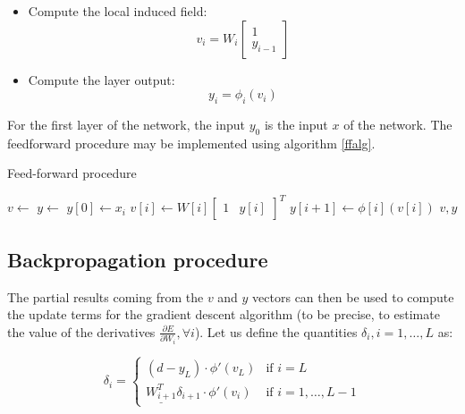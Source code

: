\documentclass[letterpaper,headings=standardclasses]{scrartcl}
\begin{document}
\begin{itemize}
    \item Compute the local induced field:
    $$ v_i = W_i \left[ \begin{matrix} 1 \\ y_{i - 1} \end{matrix} \right] $$
    \item Compute the layer output:
    $$ y_i = \phi_i (v_i) $$
\end{itemize}

For the first layer of the network, the input $y_0$ is the input $x$ of the network. The feedforward procedure may be implemented using algorithm \ref{ffalg}.

\begin{algorithm}[h]
    \caption{Feed-forward procedure}
    \label{ffalg}
    \begin{algorithmic}
    
        \State {}
        \State $v \gets $ 
        \State $y \gets $ 
        \State $y[0] \gets x_i$
        \State {}
            \State $v[i] \gets W[i] \left[ \begin{matrix} 1 & y[i] \end{matrix} \right]^T$
            \State $y[i + 1] \gets \phi[i](v[i])$
        \EndFor
        \State \Return $v, y$
    \EndFunction
    
    \end{algorithmic}
\end{algorithm}

\subsection{Backpropagation procedure}

The partial results coming from the $v$ and $y$ vectors can then be used to compute the update terms for the gradient descent algorithm (to be precise, to estimate the value of the derivatives $\frac{\partial E}{\partial W_i}, \forall i$). Let us define the quantities $\delta_i, i = 1, \dots, L$ as:

$$ \delta_i = \begin{cases} (d - y_L) \cdot \phi'(v_L) & \text{if } i = L \\ \underline{W_{i + 1}^T} \delta_{i + 1} \cdot \phi'(v_i) & \text{if } i = 1, \dots, L - 1 \end{cases} $$
\end{document}
